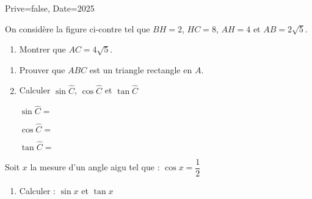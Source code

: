 \documentclass[a4paper,12pt]{article}
\begin{document}
\begin{Maquette}[Exam]{Prive=false, Date=2025}
\begin{exercice}[BaremeDetaille]
On considère la figure ci-contre tel que $BH=2$, $HC=8$, $AH=4$ et $AB=2\sqrt{5}$.
\vspace*{3mm}

\begin{minipage}{.7\linewidth}
\begin{enumerate}
\item{} Montrer que $AC=4\sqrt{5}$.\newline\anserline[6]
\end{enumerate}
\end{minipage}%
\begin{minipage}{.3\linewidth}
\end{minipage}%
\begin{enumerate}[start=2]
\item{} Prouver que $ABC$ est un triangle rectangle en $A$.\newline\anserline[7]
\item{} Calculer $\sin\widehat{C}$, $\cos\widehat{C}$ et $\tan\widehat{C}$\vspace{2mm}

\begin{minipage}{.3\linewidth}
$\sin\widehat{C}=$\anserline[4]
\end{minipage}\hfill\vrule\hfill%
\begin{minipage}{.3\linewidth}
$\cos\widehat{C}=$\anserline[4]
\end{minipage}\hfill\vrule\hfill%
\begin{minipage}{.3\linewidth}
$\tan\widehat{C}=$\anserline[4]
\end{minipage}
\end{enumerate}
\end{exercice}

\begin{exercice}[BaremeDetaille]
Soit $x$ la mesure d'un angle aigu tel que : $\cos x =\dfrac{1}{2}$
\begin{enumerate}
\item{} Calculer : $\sin x$ et $\tan x$\vspace{5mm}


\end{enumerate}
\end{exercice}
\end{Maquette}
\end{document}
